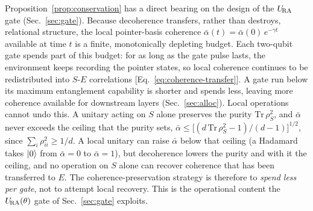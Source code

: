\begin{remark}
Proposition~\ref{prop:conservation} has a direct bearing on the
design of the $U_{\!\mathrm{RA}}$ gate (Sec.~\ref{sec:gate}).
Because decoherence transfers, rather than destroys, relational
structure, the local pointer-basis coherence
$\bar{\alpha}(t) = \bar{\alpha}(0)\,e^{-\gamma t}$ available at time $t$
is a finite, monotonically depleting budget.
Each two-qubit gate spends part of this budget: for as long as the
gate pulse lasts, the environment keeps recording the pointer states,
so local coherence continues to be redistributed into $S$-$E$
correlations [Eq.~\eqref{eq:coherence-transfer}].
A gate run below its maximum entanglement capability is shorter and
spends less, leaving more coherence available for downstream layers
(Sec.~\ref{sec:alloc}).
Local operations cannot undo this.
A unitary acting on $S$ alone preserves the purity
$\mathrm{Tr}\,\rho_S^2$, and $\bar\alpha$ never exceeds the ceiling that
the purity sets,
$\bar\alpha \le \bigl[(d\,\mathrm{Tr}\,\rho_S^2 - 1)/(d-1)\bigr]^{1/2}$,
since $\sum_i \rho_{ii}^2 \ge 1/d$.
A local unitary can raise $\bar\alpha$ below that ceiling (a Hadamard
takes $\ket{0}$ from $\bar\alpha = 0$ to $\bar\alpha = 1$), but
decoherence lowers the purity and with it the ceiling, and no operation
on $S$ alone can recover coherence that has been transferred to $E$.
The coherence-preservation strategy is therefore to
\emph{spend less per gate}, not to attempt local recovery.
This is the operational content the $U_{\!\mathrm{RA}}(\theta)$ gate of
Sec.~\ref{sec:gate} exploits.
\end{remark}
